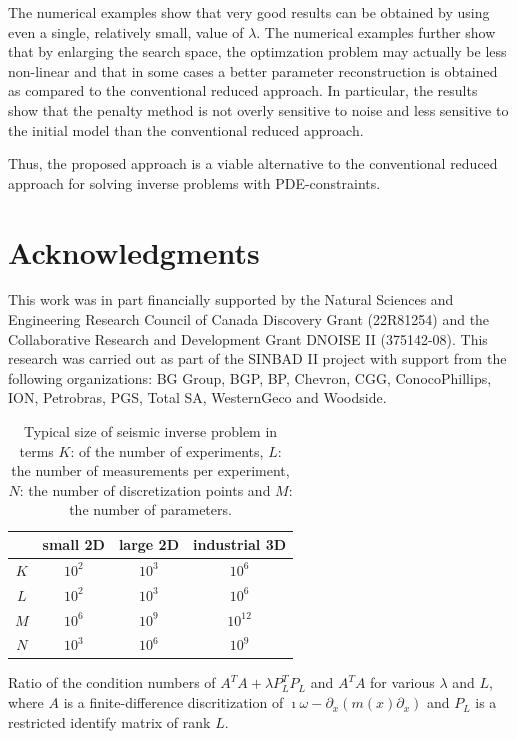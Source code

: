 \documentclass{iopart}
\begin{document}
The numerical examples show that very good results can be obtained by using even a single, relatively small, value of $\lambda$. The numerical examples further show that by enlarging the search space, the optimzation problem may actually be less non-linear and that in some cases a better parameter reconstruction is obtained as compared to the conventional reduced approach. In particular, the results show that the penalty method is not overly sensitive to noise and less sensitive to the initial model than the conventional reduced approach. 

Thus, the proposed approach is a viable alternative to the conventional reduced approach for solving inverse problems with PDE-constraints.

\section*{Acknowledgments}
This work was in part financially supported by
the Natural Sciences and Engineering Research Council of Canada
Discovery Grant (22R81254) and the Collaborative Research and
Development Grant DNOISE II (375142-08). This research was carried out
as part of the SINBAD II project with support from the following
organizations: BG Group, BGP, BP, Chevron, CGG, ConocoPhillips, ION,
Petrobras, PGS, Total SA, WesternGeco and Woodside.


\clearpage

\begin{table}
\centering
\begin{tabular}{c|c|c|c}
 	& small 2D 	& large 2D 	& industrial 3D 	\\
\hline
$K$	&   $10^2$	& $10^3$	&    $10^6$     	\\
$L$	&   $10^2$	& $10^3$	&	$10^6$			\\
$M$	&   $10^6$	& $10^9$	&	$10^{12}$		\\
$N$	&   $10^3$  & $10^6$	&	$10^9$			\\
\end{tabular}
\caption{Typical size of seismic inverse problem in terms $K$: of the number of experiments, $L$: the number of measurements per experiment, $N$: the number of discretization points and $M$: the number of parameters.}
\label{table:sizes}
\end{table}

\begin{table}
\centering

\caption{Ratio of the condition numbers of $A^T\!A + \lambda P_L^T\!P_L$ and $A^T\!A$ for various $\lambda$ and $L$, where $A$ is a finite-difference discritization of $\imath\omega - \partial_x\left(m(x)\partial_x\right)$
and $P_L$ is a restricted identify matrix of rank $L$. }
\label{table:example2}
\end{table}
\end{document}
